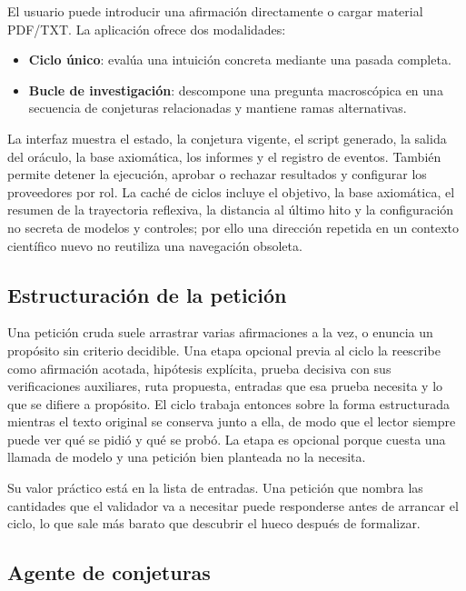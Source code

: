 \documentclass[11pt,a4paper]{article}
\begin{document}
El usuario puede introducir una afirmación directamente o cargar material PDF/TXT. La aplicación ofrece dos modalidades:

\begin{itemize}
  \item \textbf{Ciclo único}: evalúa una intuición concreta mediante una pasada completa.
  \item \textbf{Bucle de investigación}: descompone una pregunta macroscópica en una secuencia de conjeturas relacionadas y mantiene ramas alternativas.
\end{itemize}

La interfaz muestra el estado, la conjetura vigente, el script generado, la salida del oráculo, la base axiomática, los informes y el registro de eventos. También permite detener la ejecución, aprobar o rechazar resultados y configurar los proveedores por rol. La caché de ciclos incluye el objetivo, la base axiomática, el resumen de la trayectoria reflexiva, la distancia al último hito y la configuración no secreta de modelos y controles; por ello una dirección repetida en un contexto científico nuevo no reutiliza una navegación obsoleta.

\subsection{Estructuración de la petición}

Una petición cruda suele arrastrar varias afirmaciones a la vez, o enuncia un propósito sin criterio decidible. Una etapa opcional previa al ciclo la reescribe como afirmación acotada, hipótesis explícita, prueba decisiva con sus verificaciones auxiliares, ruta propuesta, entradas que esa prueba necesita y lo que se difiere a propósito. El ciclo trabaja entonces sobre la forma estructurada mientras el texto original se conserva junto a ella, de modo que el lector siempre puede ver qué se pidió y qué se probó. La etapa es opcional porque cuesta una llamada de modelo y una petición bien planteada no la necesita.

Su valor práctico está en la lista de entradas. Una petición que nombra las cantidades que el validador va a necesitar puede responderse antes de arrancar el ciclo, lo que sale más barato que descubrir el hueco después de formalizar.

\subsection{Agente de conjeturas}
\end{document}
